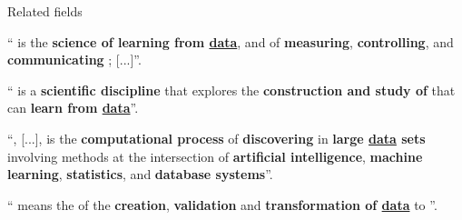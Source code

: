 \documentclass[14pt]{beamer}
\begin{document}
\begin{frame}{Related fields}\fontsize{12}{12}\sf
\begin{block}{}
`` is the \textbf{science of learning from \underline{data}}, and of \textbf{measuring}, \textbf{controlling}, and \textbf{communicating }; [...]''.
\end{block}

\begin{block}{}
`` is a \textbf{scientific discipline} that explores the \textbf{construction and study of } that can \textbf{learn from \underline{data}}''.
\end{block}

\begin{block}{}
``, [...], is the \textbf{computational process} of \textbf{discovering } in \textbf{large \underline{data} sets} involving methods at the intersection of \textbf{artificial intelligence}, \textbf{machine learning}, \textbf{statistics}, and \textbf{database systems}''.
\end{block}

\begin{block}{}
`` means the \textbf{} of the \textbf{creation}, \textbf{validation} and \textbf{transformation of \underline{data}} to \textbf{}''.
\end{block}

\end{frame}

\begin{comment}

\begin{frame}{Why study business analytics?}
\vspace{-.3cm}
\begin{center}
\includemedia[
label=obama_data_science,
  width=.99\linewidth,height=0.55\linewidth,
  activate=pageopen,
  addresource=videos/obama-datascience.mp4,
  flashvars={source=videos/obama-datascience.mp4
&modestbranding=1 %
&autohide=1 %
&showinfo=0 %
&rel=0
  }
]{}{VPlayer.swf}
\mediabutton[
mediacommand=obama_data_science:playPause,
overface=\color{blue}{\fbox{\strut Play/Pause}},
downface=\color{red}{\fbox{\strut Play/Pause}}
]{\fbox{\strut Play/Pause}} 
\end{center}



\end{frame}

\end{comment}
\end{document}
